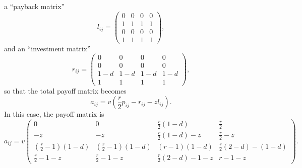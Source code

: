 \documentclass[13pt]{amsart}
\begin{document}
a ``payback matrix''
\begin{equation}
    l_{ij} =
    \begin{pmatrix}
        0 & 0 & 0 & 0 \\
        1 & 1 & 1 & 1 \\
        0 & 0 & 0 & 0 \\
        1 & 1 & 1 & 1
    \end{pmatrix},
\end{equation}
and an ``investment matrix''
\begin{equation}
    r_{ij} =
    \begin{pmatrix}
        0 & 0 & 0 & 0 \\
        0 & 0 & 0 & 0 \\
        1-d & 1-d & 1-d & 1-d \\
        1 & 1 & 1 & 1
    \end{pmatrix},
\end{equation}
so that the total payoff matrix becomes
\begin{equation}
    a_{ij} = v(\frac{r}{2} p_{ij} - r_{ij} - zl_{ij}).
\end{equation}
In this case, the payoff matrix is
\begin{equation}
    a_{ij} = v
    \begin{pmatrix}
        0 & 0 & \frac{r}{2}(1-d) & \frac{r}{2} \\
        -z & -z & \frac{r}{2}(1-d) -z & \frac{r}{2} -z \\
        (\frac{r}{2} - 1)(1-d) & (\frac{r}{2} - 1)(1-d) & (r-1)(1-d)& \frac{r}{2}(2 - d) - (1-d)\\
        \frac{r}{2} - 1 - z & \frac{r}{2} - 1 -z & \frac{r}{2}(2 - d) - 1 - z & r - 1 -z
    \end{pmatrix}.
\end{equation}
\end{document}
